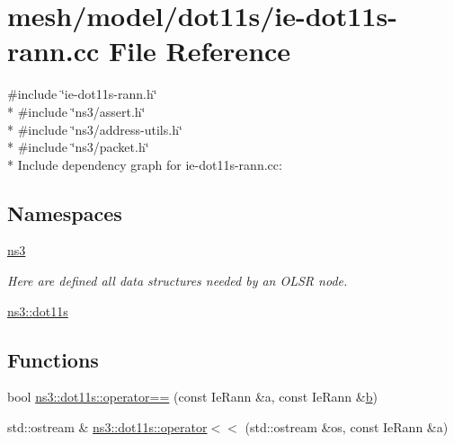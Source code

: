 \hypertarget{ie-dot11s-rann_8cc}{}\section{mesh/model/dot11s/ie-\/dot11s-\/rann.cc File Reference}
\label{ie-dot11s-rann_8cc}
{\ttfamily \#include \char`\"{}ie-\/dot11s-\/rann.\+h\char`\"{}}\\*
{\ttfamily \#include \char`\"{}ns3/assert.\+h\char`\"{}}\\*
{\ttfamily \#include \char`\"{}ns3/address-\/utils.\+h\char`\"{}}\\*
{\ttfamily \#include \char`\"{}ns3/packet.\+h\char`\"{}}\\*
Include dependency graph for ie-\/dot11s-\/rann.cc\+:
\subsection*{Namespaces}
\begin{DoxyCompactItemize}
\item 
 \hyperlink{namespacens3}{ns3}
\begin{DoxyCompactList}\small\item\em Here are defined all data structures needed by an O\+L\+SR node. \end{DoxyCompactList}\item 
 \hyperlink{namespacens3_1_1dot11s}{ns3\+::dot11s}
\end{DoxyCompactItemize}
\subsection*{Functions}
\begin{DoxyCompactItemize}
\item 
bool \hyperlink{namespacens3_1_1dot11s_aa1e9174cea8c71e08b32545c8446fe8a}{ns3\+::dot11s\+::operator==} (const Ie\+Rann \&a, const Ie\+Rann \&\hyperlink{lte__pathloss_8m_a21ad0bd836b90d08f4cf640b4c298e7c}{b})
\item 
std\+::ostream \& \hyperlink{namespacens3_1_1dot11s_ab3f0282bfa1e20f94cf62dde642817df}{ns3\+::dot11s\+::operator$<$$<$} (std\+::ostream \&os, const Ie\+Rann \&a)
\end{DoxyCompactItemize}
